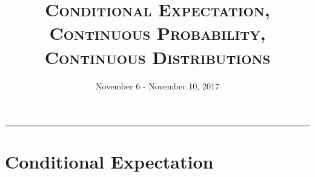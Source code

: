 \documentclass{exam}
\title{\textsc{Conditional Expectation, Continuous Probability, Continuous Distributions}}
\date{November 6 - November 10, 2017}
\begin{document}
\maketitle
\rule{\textwidth}{0.15em}
\fontsize{12}{15}\selectfont
\thispagestyle{empty}

%
%
\section{Conditional Expectation}
\end{document}
